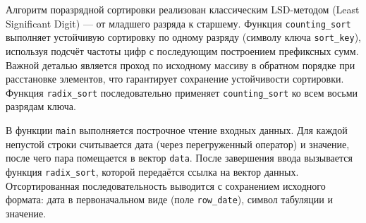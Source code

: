 Алгоритм поразрядной сортировки реализован классическим LSD-методом (Least Significant Digit) --- от младшего разряда к старшему.
Функция \texttt{counting\_sort} выполняет устойчивую сортировку по одному разряду (символу ключа \texttt{sort\_key}),
используя подсчёт частоты цифр с последующим построением префиксных сумм. Важной деталью является проход по исходному массиву в
обратном порядке при расстановке элементов, что гарантирует сохранение устойчивости сортировки. Функция \texttt{radix\_sort}
последовательно применяет \texttt{counting\_sort} ко всем восьми разрядам ключа.

В функции \texttt{main} выполняется построчное чтение входных данных. Для каждой непустой строки считывается дата
(через перегруженный оператор) и значение, после чего пара помещается в вектор \texttt{data}. После завершения ввода вызывается
функция \texttt{radix\_sort}, которой передаётся ссылка на вектор данных. Отсортированная последовательность выводится с
сохранением исходного формата: дата в первоначальном виде (поле \texttt{row\_date}), символ табуляции и значение.

